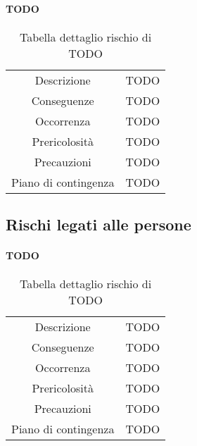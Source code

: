 \paragraph{TODO}
\renewcommand{\arraystretch}{1}
    \begin{table}[H]
        \begin{center}
            \setlength{\aboverulesep}{0pt}
            \setlength{\belowrulesep}{0pt}
            \setlength{\extrarowheight}{.75ex}
            \begin{tabular}{ c c }
                \rowcolor{AzzurroGruppo!30} 
                \toprule
                Descrizione & TODO \\
                Conseguenze & TODO \\
                Occorrenza & TODO \\
                Prericolosità & TODO \\
                Precauzioni & TODO \\
                Piano di contingenza & TODO \\
                \bottomrule
            \end{tabular}
            \caption{Tabella dettaglio rischio di TODO}
        \end{center}
    \end{table}

\subsection{Rischi legati alle persone}

\paragraph{TODO}
\renewcommand{\arraystretch}{1}
    \begin{table}[H]
        \begin{center}
            \setlength{\aboverulesep}{0pt}
            \setlength{\belowrulesep}{0pt}
            \setlength{\extrarowheight}{.75ex}
            \begin{tabular}{ c c }
                \rowcolor{AzzurroGruppo!30} 
                \toprule
                Descrizione & TODO \\
                Conseguenze & TODO \\
                Occorrenza & TODO \\
                Prericolosità & TODO \\
                Precauzioni & TODO \\
                Piano di contingenza & TODO \\
                \bottomrule
            \end{tabular}
            \caption{Tabella dettaglio rischio di TODO}
        \end{center}
    \end{table}